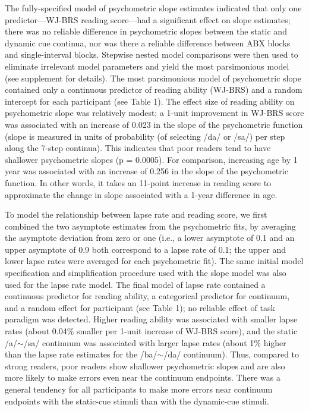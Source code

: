 \documentclass[../uwthesis.tex]{subfiles}
\begin{document}
The fully-specified model of psychometric slope estimates indicated that only one predictor—WJ-BRS reading score—had a significant effect on slope estimates; there was no reliable difference in psychometric slopes between the static and dynamic cue continua, nor was there a reliable difference between ABX blocks and single-interval blocks. Stepwise nested model comparisons were then used to eliminate irrelevant model parameters and yield the most parsimonious model (see supplement for details). The most parsimonious model of psychometric slope contained only a continuous predictor of reading ability (WJ-BRS) and a random intercept for each participant (see Table 1).  The effect size of reading ability on psychometric slope was relatively modest; a 1-unit improvement in WJ-BRS score was associated with an increase of 0.023 in the slope of the psychometric function (slope is measured in units of probability (of selecting /da/ or /sa/) per step along the 7-step continua). This indicates that poor readers tend to have shallower psychometric slopes (p = 0.0005). For comparison, increasing age by 1 year was associated with an increase of 0.256 in the slope of the psychometric function. In other words, it takes an 11-point increase in reading score to approximate the change in slope associated with a 1-year difference in age.

To model the relationship between lapse rate and reading score, we first combined the two asymptote estimates from the psychometric fits, by averaging the asymptote deviation from zero or one (i.e., a lower asymptote of 0.1 and an upper asymptote of 0.9 both correspond to a lapse rate of 0.1; the upper and lower lapse rates were averaged for each psychometric fit). The same initial model specification and simplification procedure used with the slope model was also used for the lapse rate model. The final model of lapse rate contained a continuous predictor for reading ability, a categorical predictor for continuum, and a random effect for participant (see Table 1); no reliable effect of task paradigm was detected. Higher reading ability was associated with smaller lapse rates (about 0.04\% smaller per 1-unit increase of WJ-BRS score), and the static /a/$\sim$/sa/ continuum was associated with larger lapse rates (about 1\% higher than the lapse rate estimates for the /ba/$\sim$/da/ continuum). Thus, compared to strong readers, poor readers show shallower psychometric slopes and are also more likely to make errors even near the continuum endpoints. There was a general tendency for all participants to make more errors near continuum endpoints with the static-cue stimuli than with the dynamic-cue stimuli. 
\end{document}
